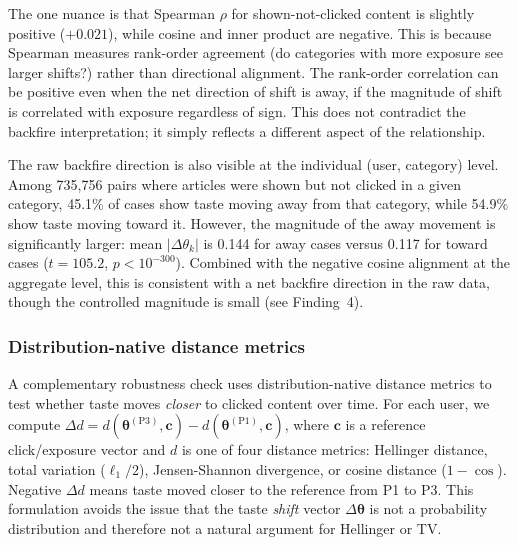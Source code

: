 \documentclass[11pt]{article}
\begin{document}
The one nuance is that Spearman $\rho$ for shown-not-clicked content is slightly positive ($+0.021$), while cosine and inner product are negative. This is because Spearman measures rank-order agreement (do categories with more exposure see larger shifts?) rather than directional alignment. The rank-order correlation can be positive even when the net direction of shift is away, if the magnitude of shift is correlated with exposure regardless of sign. This does not contradict the backfire interpretation; it simply reflects a different aspect of the relationship.

The raw backfire direction is also visible at the individual (user, category) level. Among 735,756 pairs where articles were shown but not clicked in a given category, 45.1\% of cases show taste moving away from that category, while 54.9\% show taste moving toward it. However, the magnitude of the away movement is significantly larger: mean $|\Delta\theta_k|$ is 0.144 for away cases versus 0.117 for toward cases ($t = 105.2$, $p < 10^{-300}$). Combined with the negative cosine alignment at the aggregate level, this is consistent with a net backfire direction in the raw data, though the controlled magnitude is small (see Finding~4).

\subsubsection{Distribution-native distance metrics}
\label{sec:dist_robustness}

A complementary robustness check uses distribution-native distance metrics to test whether taste moves \emph{closer} to clicked content over time. For each user, we compute $\Delta d = d(\boldsymbol{\theta}^{(\text{P3})}, \mathbf{c}) - d(\boldsymbol{\theta}^{(\text{P1})}, \mathbf{c})$, where $\mathbf{c}$ is a reference click/exposure vector and $d$ is one of four distance metrics: Hellinger distance, total variation ($\ell_1/2$), Jensen-Shannon divergence, or cosine distance ($1 - \cos$). Negative $\Delta d$ means taste moved closer to the reference from P1 to P3. This formulation avoids the issue that the taste \emph{shift} vector $\Delta\boldsymbol{\theta}$ is not a probability distribution and therefore not a natural argument for Hellinger or TV.
\end{document}
